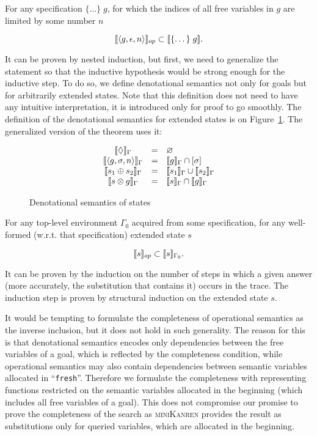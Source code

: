 \begin{theorem}
For any specification $\{\dots\}\; g$, for which the indices of all free variables in $g$ are limited by some number $n$

\[
\llbracket{\left<{g, \epsilon, n}\right>}\rrbracket_{op} \subset \llbracket{\{\dots\}\; g}\rrbracket.
\]
\end{theorem}

It can be proven by nested induction, but first, we need to generalize the statement so that the inductive hypothesis would be strong enough for the inductive step.
To do so, we define denotational semantics not only for goals but for arbitrarily extended states. Note that this definition does not need to have any intuitive
interpretation, it is introduced only for proof to go smoothly. The definition of the denotational semantics for extended states is on Figure~\ref{denotational_semantics_of_states}.
The generalized version of the theorem uses it:

\begin{figure}[t]
  \[
  \begin{array}{ccl}
    \llbracket{\Diamond}\rrbracket_\Gamma&=&\varnothing\\
    \llbracket{\left<{g, \sigma, n}\right>}\rrbracket_\Gamma&=&\llbracket{g}\rrbracket_\Gamma\cap[\sigma]\\
    \llbracket{s_1 \oplus s_2}\rrbracket_\Gamma&=&\llbracket{s_1}\rrbracket_\Gamma\cup\llbracket{s_2}\rrbracket_\Gamma\\
    \llbracket{s \otimes g}\rrbracket_\Gamma&=&\llbracket{s}\rrbracket_\Gamma\cap\llbracket{g}\rrbracket_\Gamma\\
  \end{array}
  \]
  \caption{Denotational semantics of states}
  \label{denotational_semantics_of_states}
\end{figure}

\begin{lemma}
For any top-level environment $\Gamma_0$ acquired from some specification, for any well-formed (w.r.t. that specification) extended state $s$

\[
\llbracket{s}\rrbracket_{op} \subset \llbracket{s}\rrbracket_{\Gamma_0}.
\]
\end{lemma}

It can be proven by the induction on the number of steps in which a given answer (more accurately, the substitution that contains it) occurs in the trace.
The induction step is proven by structural induction on the extended state $s$.

It would be tempting to formulate the completeness of operational semantics as the inverse inclusion, but it does not hold in such generality. The reason for
this is that denotational semantics encodes only dependencies between the free variables of a goal, which is reflected by the completeness condition, while
operational semantics may also contain dependencies between semantic variables allocated in ``\lstinline|fresh|''. Therefore we formulate the completeness
with representing functions restricted on the semantic variables allocated in the beginning (which includes all free variables of a goal). This does not
compromise our promise to prove the completeness of the search as \textsc{miniKanren} provides the result as substitutions only for queried variables,
which are allocated in the beginning.

